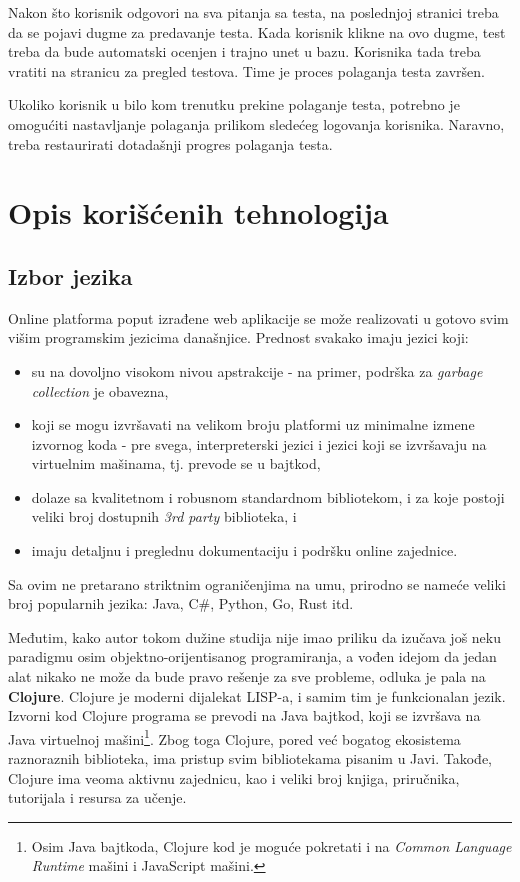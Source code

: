 Nakon što korisnik odgovori na sva pitanja sa testa, na poslednjoj stranici treba da se pojavi dugme za predavanje testa. Kada korisnik klikne na ovo dugme, test treba da bude automatski ocenjen i trajno unet u bazu. Korisnika tada treba vratiti na stranicu za pregled testova. Time je proces polaganja testa završen.

Ukoliko korisnik u bilo kom trenutku prekine polaganje testa, potrebno je omogućiti nastavljanje polaganja prilikom sledećeg logovanja korisnika. Naravno, treba restaurirati dotadašnji progres polaganja testa.

\section{Opis korišćenih tehnologija}
\subsection{Izbor jezika}
Online platforma poput izrađene web aplikacije se može realizovati u gotovo svim višim programskim jezicima današnjice. Prednost svakako imaju jezici koji:
\begin{itemize}
\renewcommand\labelitemi{--}
\item su na dovoljno visokom nivou apstrakcije - na primer, podrška za \textit{garbage collection} je obavezna,
\item koji se mogu izvršavati na velikom broju platformi uz minimalne izmene izvornog koda - pre svega, interpreterski jezici i jezici koji se izvršavaju na virtuelnim mašinama, tj. prevode se u bajtkod,
\item dolaze sa kvalitetnom i robusnom standardnom bibliotekom, i za koje postoji veliki broj dostupnih \textit{3rd party} biblioteka, i
\item imaju detaljnu i preglednu dokumentaciju i podršku online zajednice.
\end{itemize}
Sa ovim ne pretarano striktnim ograničenjima na umu, prirodno se nameće veliki broj popularnih jezika: Java, C\#, Python, Go, Rust itd.

Međutim, kako autor tokom dužine studija nije imao priliku da izučava još neku paradigmu osim objektno-orijentisanog programiranja, a vođen idejom da jedan alat nikako ne može da bude pravo rešenje za sve probleme, odluka je pala na \textbf{Clojure}. Clojure je moderni dijalekat LISP-a, i samim tim je funkcionalan jezik. Izvorni kod Clojure programa se prevodi na Java bajtkod, koji se izvršava na Java virtuelnoj mašini\footnote{Osim Java bajtkoda, Clojure kod je moguće pokretati i na \textit{Common Language Runtime} mašini i JavaScript mašini.}. Zbog toga Clojure, pored već bogatog ekosistema raznoraznih biblioteka, ima pristup svim bibliotekama pisanim u Javi. Takođe, Clojure ima veoma aktivnu zajednicu, kao i veliki broj knjiga\cite{Emerick:2012:CP}\cite{Higginbotham:2015:CBT}, priručnika, tutorijala i resursa za učenje.

